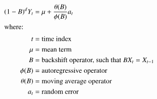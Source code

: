 \begin{align}
    (1-B)^dY_t &= \mu + \frac{\theta(B)}{\phi(B)}a_t \\ 
    \intertext{where:}
    t &= \mbox{time index} \nonumber \\
    \mu &= \mbox{mean term} \nonumber \\
    B &= \mbox{backshift operator, such that } BX_t = X_{t-1} \nonumber \\
    \phi(B) &= \mbox{autoregressive operator} \nonumber \\
    \theta(B) &= \mbox{moving average operator} \nonumber \\
    a_t &= \mbox{random error} \nonumber 
\end{align}

